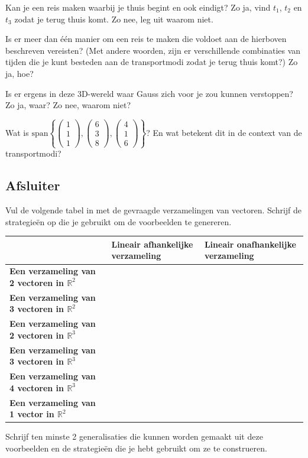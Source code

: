 \documentclass{ximera}
\begin{document}
\begin{exercise}
Kan je een reis maken waarbij je thuis begint en ook eindigt?
Zo ja, vind \(t_1\), \(t_2\) en \(t_3\) zodat je terug thuis komt.
Zo nee, leg uit waarom niet.

\begin{question}
Is er meer dan één manier om een reis te maken die voldoet aan de hierboven beschreven vereisten?
(Met andere woorden, zijn er verschillende combinaties van tijden die je kunt besteden aan de transportmodi zodat je terug thuis komt?)
Zo ja, hoe?
\end{question}

\begin{question}
Is er ergens in deze 3D-wereld waar Gauss zich voor je zou kunnen verstoppen?
Zo ja, waar?
Zo nee, waarom niet?
\end{question}

\begin{question}
Wat is \(\text{span}\left\{\begin{pmatrix} 1 \\ 1 \\ 1 \end{pmatrix}, \begin{pmatrix} 6 \\ 3 \\ 8 \end{pmatrix}, \begin{pmatrix} 4 \\ 1 \\ 6 \end{pmatrix}\right\}\)?
En wat betekent dit in de context van de transportmodi?
\end{question}
\end{exercise}

\subsection*{Afsluiter}
Vul de volgende tabel in met de gevraagde verzamelingen van vectoren.
Schrijf de strategieën op die je gebruikt om de voorbeelden te genereren.
\begin{table}[H]
\begin{tabular}{|p{4cm}|p{4cm}|p{4cm}|}
\hline
& \textbf{Lineair afhankelijke verzameling} & \textbf{Lineair onafhankelijke verzameling} \\
\hline
\textbf{Een verzameling van 2 vectoren in $\mathbb{R}^2$} & & \\
\hline
\textbf{Een verzameling van 3 vectoren in $\mathbb{R}^2$} & & \\
\hline
\textbf{Een verzameling van 2 vectoren in $\mathbb{R}^3$} & & \\
\hline
\textbf{Een verzameling van 3 vectoren in $\mathbb{R}^3$} & & \\
\hline
\textbf{Een verzameling van 4 vectoren in $\mathbb{R}^3$} & & \\
\hline
\textbf{Een verzameling van 1 vector in \(\mathbb{R}^2\)}  &  & \\
\hline
\end{tabular}
\end{table}
Schrijf ten minste 2 generalisaties die kunnen worden gemaakt uit deze voorbeelden en de strategieën die je hebt gebruikt om ze te construeren.
\end{document}
